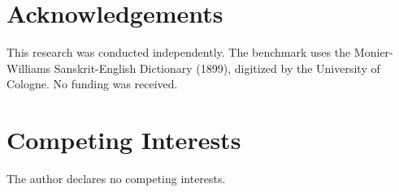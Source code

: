 \documentclass{article}
\begin{document}
\section*{Acknowledgements}

This research was conducted independently. The benchmark uses the Monier-Williams Sanskrit-English Dictionary (1899), digitized by the University of Cologne. No funding was received.

\section*{Competing Interests}

The author declares no competing interests.



\end{document}
